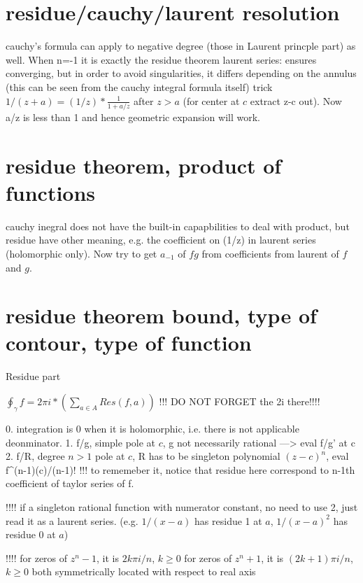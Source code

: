 \section*{residue/cauchy/laurent resolution}


cauchy's formula can apply to negative degree (those in Laurent princple part) as well. When n=-1 it is exactly the residue theorem
laurent series: ensures converging, but in order to avoid singularities, it differs depending on the annulus (this can be seen from the cauchy integral formula itself)
trick $1/(z+a) = (1/z)*\frac{1}{1+a/z}$ after $z > a$ (for center at $c$ extract z-c out). Now a/z is less than 1 and hence geometric expansion will work.

 
\section*{residue theorem, product of functions}
cauchy inegral does not have the built-in capapbilities to deal with product, but residue have other meaning, e.g. the coefficient on (1/z) in laurent series
(holomorphic only). Now try to get $a_{-1}$ of $fg$ from coefficients from laurent of $f$ and $g$.




\section*{residue theorem bound, type of contour, type of function}
Residue part
	
    $\oint_\gamma f = 2\pi i*(\sum_{a \in A} Res(f,a))$
    !!! DO NOT FORGET the 2\pi i there!!!!

	0. integration is 0 when it is holomorphic, i.e. there is not applicable deonminator.
    1. f/g, simple pole at $c$, g not necessarily rational ---> eval f/g' at c
    2. f/R, degree $n>1$ pole at $c$, R has to be singleton polynomial $(z-c)^n$, eval f^{(n-1)}(c)/(n-1)!
		!!! to rememeber it, notice that residue here correspond to n-1th coefficient of taylor series of f.
		
		!!!! if a singleton rational function with numerator constant, no need to use 2, just read it as a laurent series. (e.g. $1/(x-a)$ has residue 1 at $a$, $1/(x-a)^2$ has residue 0 at $a$)


!!!!
    for zeros of $z^n-1$, it is $2k\pi i/n$, $k \geq 0$
    for zeros of $z^n+1$, it is $(2k+1)\pi i/n$, $k \geq 0$ 
    both symmetrically located with respect to real axis






